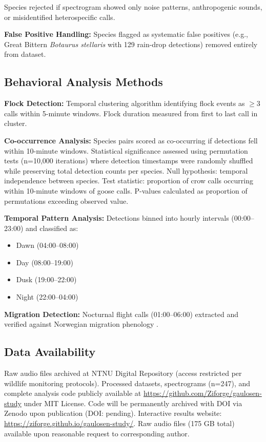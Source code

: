 \documentclass[twocolumn]{article}
\begin{document}
Species rejected if spectrogram showed only noise patterns, anthropogenic sounds, or misidentified heterospecific calls.

\textbf{False Positive Handling:} Species flagged as systematic false positives (e.g., Great Bittern \textit{Botaurus stellaris} with 129 rain-drop detections) removed entirely from dataset.

\subsection{Behavioral Analysis Methods}

\textbf{Flock Detection:} Temporal clustering algorithm identifying flock events as $\geq$3 calls within 5-minute windows. Flock duration measured from first to last call in cluster.

\textbf{Co-occurrence Analysis:} Species pairs scored as co-occurring if detections fell within 10-minute windows. Statistical significance assessed using permutation tests (n=10,000 iterations) where detection timestamps were randomly shuffled while preserving total detection counts per species. Null hypothesis: temporal independence between species. Test statistic: proportion of crow calls occurring within 10-minute windows of goose calls. P-values calculated as proportion of permutations exceeding observed value.

\textbf{Temporal Pattern Analysis:} Detections binned into hourly intervals (00:00--23:00) and classified as:
\begin{itemize}
\item Dawn (04:00--08:00)
\item Day (08:00--19:00)
\item Dusk (19:00--22:00)
\item Night (22:00--04:00)
\end{itemize}

\textbf{Migration Detection:} Nocturnal flight calls (01:00--06:00) extracted and verified against Norwegian migration phenology \citep{Shimmings2016}.

\subsection{Data Availability}

Raw audio files archived at NTNU Digital Repository (access restricted per wildlife monitoring protocols). Processed datasets, spectrograms (n=247), and complete analysis code publicly available at \url{https://github.com/Ziforge/gaulosen-study} under MIT License. Code will be permanently archived with DOI via Zenodo upon publication (DOI: pending). Interactive results website: \url{https://ziforge.github.io/gaulosen-study/}. Raw audio files (175 GB total) available upon reasonable request to corresponding author.
\end{document}
